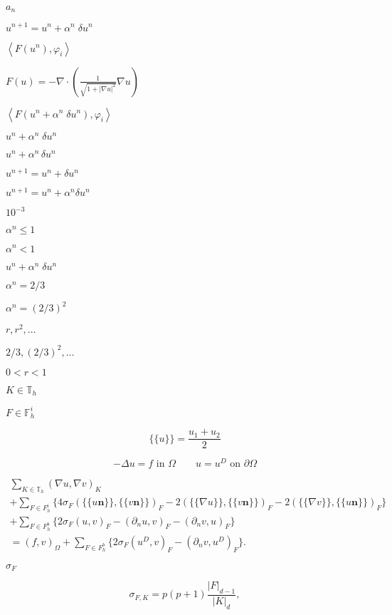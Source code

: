 \documentclass{article}
\begin{document}
$a_{n}$
\pagebreak

$u^{n+1}=u^n+\alpha^n\;\delta u^n$
\pagebreak

$\left<F(u^n),\varphi_i\right>$
\pagebreak

$F(u)=-\nabla \cdot \left( \frac{1}{\sqrt{1+|\nabla u|^{2}}}\nabla u \right)$
\pagebreak

$\left<F(u^n+\alpha^n\;\delta u^n),\varphi_i\right>$
\pagebreak

$u^n+\alpha^n\;\delta u^n$
\pagebreak

$u^n+\alpha^n\,\delta u^n$
\pagebreak

$u^{n+1}=u^n+\delta u^n$
\pagebreak

$u^{n+1}=u^n+\alpha^n\delta u^n$
\pagebreak

$10^{-3}$
\pagebreak

$\alpha^n\le 1$
\pagebreak

$\alpha^n<1$
\pagebreak

$u^n + \alpha^n\;\delta u^n$
\pagebreak

$\alpha^n=2/3$
\pagebreak

$\alpha^n=(2/3)^2$
\pagebreak

$r, r^2, \ldots$
\pagebreak

$2/3, (2/3)^2, \ldots$
\pagebreak

$0<r<1$
\pagebreak

$K\in \mathbb T_h$
\pagebreak

$F\in \mathbb F_h^i$
\pagebreak

\[ \{\!\{ u \}\!\} = \frac{u_1 + u_2}2 \]
\pagebreak

\[ -\Delta u = f \text{ in }\Omega \qquad u = u^D \text{ on } \partial\Omega \]
\pagebreak

\begin{multline*} \sum_{K\in \mathbb T_h} (\nabla u, \nabla v)_K \\ + \sum_{F \in F_h^i} \biggl\{4\sigma_F (\{\!\{ u \mathbf n\}\!\}, \{\!\{ v \mathbf n \}\!\})_F - 2 (\{\!\{ \nabla u \}\!\},\{\!\{ v\mathbf n \}\!\})_F - 2 (\{\!\{ \nabla v \}\!\},\{\!\{ u\mathbf n \}\!\})_F \biggr\} \\ + \sum_{F \in F_h^b} \biggl\{2\sigma_F (u, v)_F - (\partial_n u,v)_F - (\partial_n v,u)_F \biggr\} \\ = (f, v)_\Omega + \sum_{F \in F_h^b} \biggl\{ 2\sigma_F (u^D, v)_F - (\partial_n v,u^D)_F \biggr\}. \end{multline*}
\pagebreak

$\sigma_F$
\pagebreak

\[ \sigma_{F,K} = p(p+1) \frac{|F|_{d-1}}{|K|_d}, \]
\pagebreak
\end{document}

